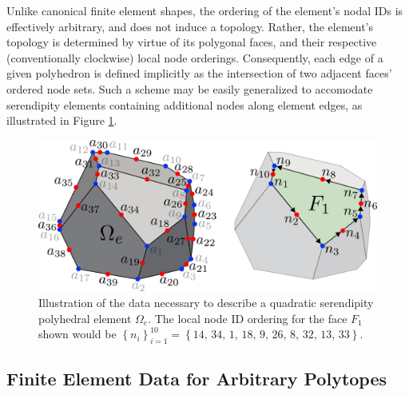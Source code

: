 	Unlike canonical finite element shapes, the ordering of the element's nodal IDs is effectively arbitrary, and does not induce a topology. Rather, the element's topology is determined by virtue of its polygonal faces, and their respective (conventionally clockwise) local node orderings. Consequently, each edge of a given polyhedron is defined implicitly as the intersection of two adjacent faces' ordered node sets. Such a scheme may be easily generalized to accomodate serendipity elements containing additional nodes along element edges, as illustrated in Figure \ref{fig:polyhedron_data_quadratic}.
	\begin{figure} [!ht]
		\centering
		\includegraphics[width = 6.0in]{figures/polyhedron_data_quadratic.pdf}
		\caption{Illustration of the data necessary to describe a quadratic serendipity polyhedral element $\Omega_e$. The local node ID ordering for the face $F_1$ shown would be $\left\{ n_i \right\}_{i=1}^{10} = \left\{ 14, \, 34, \, 1, \, 18, \, 9, \, 26, \, 8, \, 32, \, 13, \, 33 \right\}$.}
		\label{fig:polyhedron_data_quadratic}
	\end{figure}
	
\subsection*{Finite Element Data for Arbitrary Polytopes}

